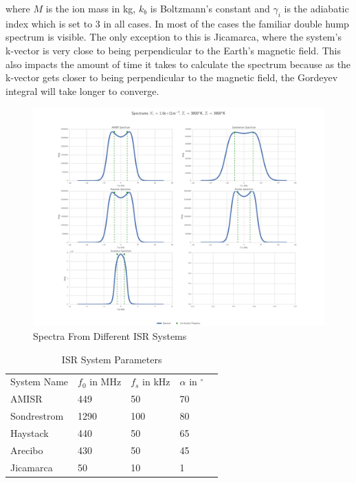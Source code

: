 \noindent where $M$ is the ion mass in kg, $k_b$ is Boltzmann's constant and $\gamma_i$ is the adiabatic index which is set to 3 in all cases. In most of the cases the familiar double hump spectrum is visible. The only exception to this is Jicamarca, where the system's k-vector is very close to being perpendicular to the Earth's magnetic field. This also impacts the amount of time it takes to calculate the spectrum because as the k-vector gets closer to being perpendicular to the magnetic field, the Gordeyev integral will take longer to converge.
\begin{figure}[!h]
\centering
\includegraphics[width=6.0in]{DifferentSystems}

\caption{Spectra From Different ISR Systems}
\label{fig:diffspectrums}
\end{figure}


\begin{table}[!h]
\centering
\caption{ISR System Parameters}
\label{tab:ISRsys}
\begin{tabular}{lllll}
System Name & $f_0$ in MHz & $f_s$ in kHz & $\alpha$ in $^\circ$ &  \\
AMISR       & 449          & 50           & 70               &  \\
Sondrestrom & 1290         & 100          & 80               &  \\
Haystack    & 440          & 50           & 65               &  \\
Arecibo     & 430          & 50           & 45               &  \\
Jicamarca   & 50           & 10           & 1                & 
\end{tabular}
\end{table}